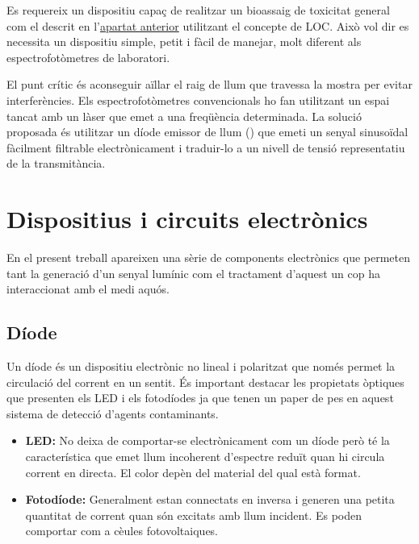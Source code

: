 Es requereix un dispositiu capaç de realitzar un bioassaig de toxicitat general com el descrit en l'\hyperref[subsec:bioassajos_microbiològics_de_toxicitat]{apartat anterior} utilitzant el concepte de \ac{LOC}. Això vol dir es necessita un dispositiu simple, petit i fàcil de manejar, molt diferent als espectrofotòmetres de laboratori. 

El punt crític és aconseguir aïllar el raig de llum que travessa la mostra per evitar interferències. Els espectrofotòmetres convencionals ho fan utilitzant un espai tancat amb un làser que emet a una freqüència determinada. La solució proposada és utilitzar un díode emissor de llum () que emeti un senyal sinusoïdal fàcilment filtrable electrònicament i traduir-lo a un nivell de tensió representatiu de la transmitància.

\section{Dispositius i circuits electrònics}\label{sec:components_circuits_electronics}

En el present treball apareixen una sèrie de components electrònics que permeten tant la generació d'un senyal lumínic com el tractament d'aquest un cop ha interaccionat amb el medi aquós.

\subsection{Díode}\label{subsec:diode}

Un díode és un dispositiu electrònic no lineal i polaritzat que només permet la circulació del corrent en un sentit. És important destacar les  propietats òptiques que presenten els \ac{LED} i els fotodíodes ja que tenen un paper de pes en aquest sistema de detecció d'agents contaminants.

\begin{itemize}
	
	\item{\textbf{\ac{LED}: }}No deixa de comportar-se electrònicament com un díode però té la característica que emet llum incoherent d'espectre reduït quan hi circula corrent en directa. El color depèn del material del qual està format.
	
	\item{\textbf{Fotodíode: }}Generalment estan connectats en inversa i generen una petita quantitat de corrent quan són excitats amb llum incident. Es poden comportar com a cè\lgem ules fotovoltaiques.
	
\end{itemize}


